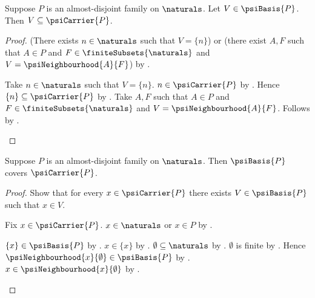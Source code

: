 \begin{proposition}\label{psi_basis_member_subset_carrier}
    Suppose $P$ is an almost-disjoint family on $\naturals$.
    Let $V\in\psiBasis{P}$.
    Then $V\subseteq\psiCarrier{P}$.
\end{proposition}
\begin{proof}
    (There exists $n\in\naturals$ such that $V=\{n\}$) or
        (there exist $A,F$ such that $A\in P$ and
            $F\in\finiteSubsets{\naturals}$ and
            $V=\psiNeighbourhood{A}{F}$)
        by .
    \begin{byCase}
            Take $n\in\naturals$ such that $V=\{n\}$.
            $n\in\psiCarrier{P}$ by
                .
            Hence $\{n\}\subseteq\psiCarrier{P}$
                by .
            Take $A,F$ such that $A\in P$ and
                $F\in\finiteSubsets{\naturals}$ and
                $V=\psiNeighbourhood{A}{F}$.
            Follows by .
    \end{byCase}
\end{proof}

\begin{proposition}\label{psi_basis_covers_carrier}
    Suppose $P$ is an almost-disjoint family on $\naturals$.
    Then $\psiBasis{P}$ covers $\psiCarrier{P}$.
\end{proposition}
\begin{proof}
    Show that for every $x\in\psiCarrier{P}$ there exists
        $V\in\psiBasis{P}$ such that $x\in V$.
    \begin{subproof}
        Fix $x\in\psiCarrier{P}$.
        $x\in\naturals$ or $x\in P$ by .
        \begin{byCase}
                $\{x\}\in\psiBasis{P}$
                    by .
                $x\in\{x\}$ by .
                $\emptyset\subseteq\naturals$ by .
                $\emptyset$ is finite by .
                Hence $\psiNeighbourhood{x}{\emptyset}\in\psiBasis{P}$
                    by .
                $x\in\psiNeighbourhood{x}{\emptyset}$
                    by .
        \end{byCase}
    \end{subproof}
\end{proof}

